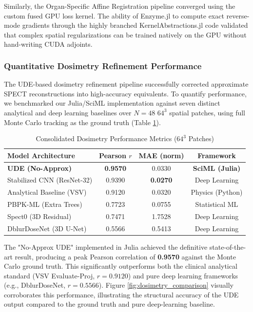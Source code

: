 \documentclass[10pt,letterpaper]{article}
\begin{document}
Similarly, the Organ-Specific Affine Registration pipeline converged using the custom fused GPU loss kernel. The ability of Enzyme.jl to compute exact reverse-mode gradients through the highly branched KernelAbstractions.jl code validated that complex spatial regularizations can be trained natively on the GPU without hand-writing CUDA adjoints.

\subsubsection*{Quantitative Dosimetry Refinement Performance}
The UDE-based dosimetry refinement pipeline successfully corrected approximate SPECT reconstructions into high-accuracy equivalents. To quantify performance, we benchmarked our Julia/SciML implementation against seven distinct analytical and deep learning baselines over $N=48$ $64^3$ spatial patches, using full Monte Carlo tracking as the ground truth (Table \ref{tab:dosimetry_metrics}). 

\begin{table}[H]
\centering
\caption{Consolidated Dosimetry Performance Metrics ($64^3$ Patches)}
\begin{tabular}{lccc}
\toprule
\textbf{Model Architecture} & \textbf{Pearson $r$} & \textbf{MAE (norm)} & \textbf{Framework} \\ \midrule
\textbf{UDE (No-Approx)} & \textbf{0.9570} & 0.0330 & \textbf{SciML (Julia)} \\
Stabilized CNN (ResNet-32) & 0.9390 & \textbf{0.0270} & Deep Learning \\
Analytical Baseline (VSV) & 0.9120 & 0.0320 & Physics (Python) \\
PBPK-ML (Extra Trees) & 0.7723 & 0.0755 & Statistical ML \\
Spect0 (3D Residual) & 0.7471 & 1.7528 & Deep Learning \\
DblurDoseNet (3D U-Net) & 0.5566 & 0.5413 & Deep Learning \\
\bottomrule
\end{tabular}
\label{tab:dosimetry_metrics}
\end{table}

The "No-Approx UDE" implemented in Julia achieved the definitive state-of-the-art result, producing a peak Pearson correlation of \textbf{0.9570} against the Monte Carlo ground truth. This significantly outperforms both the clinical analytical standard (VSV Evaluate-Proj, $r=0.9120$) and pure deep learning frameworks (e.g., DblurDoseNet, $r=0.5566$). Figure \ref{fig:dosimetry_comparison} visually corroborates this performance, illustrating the structural accuracy of the UDE output compared to the ground truth and pure deep-learning baseline.
\end{document}
